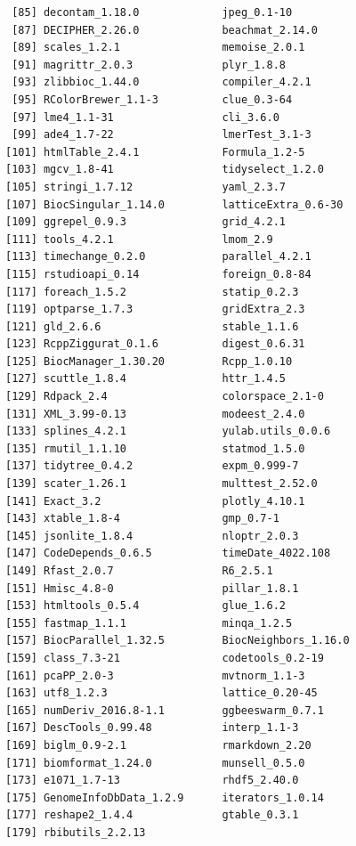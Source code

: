 \documentclass[
]{book}
\begin{document}
\begin{verbatim}
 [85] decontam_1.18.0             jpeg_0.1-10                
 [87] DECIPHER_2.26.0             beachmat_2.14.0            
 [89] scales_1.2.1                memoise_2.0.1              
 [91] magrittr_2.0.3              plyr_1.8.8                 
 [93] zlibbioc_1.44.0             compiler_4.2.1             
 [95] RColorBrewer_1.1-3          clue_0.3-64                
 [97] lme4_1.1-31                 cli_3.6.0                  
 [99] ade4_1.7-22                 lmerTest_3.1-3             
[101] htmlTable_2.4.1             Formula_1.2-5              
[103] mgcv_1.8-41                 tidyselect_1.2.0           
[105] stringi_1.7.12              yaml_2.3.7                 
[107] BiocSingular_1.14.0         latticeExtra_0.6-30        
[109] ggrepel_0.9.3               grid_4.2.1                 
[111] tools_4.2.1                 lmom_2.9                   
[113] timechange_0.2.0            parallel_4.2.1             
[115] rstudioapi_0.14             foreign_0.8-84             
[117] foreach_1.5.2               statip_0.2.3               
[119] optparse_1.7.3              gridExtra_2.3              
[121] gld_2.6.6                   stable_1.1.6               
[123] RcppZiggurat_0.1.6          digest_0.6.31              
[125] BiocManager_1.30.20         Rcpp_1.0.10                
[127] scuttle_1.8.4               httr_1.4.5                 
[129] Rdpack_2.4                  colorspace_2.1-0           
[131] XML_3.99-0.13               modeest_2.4.0              
[133] splines_4.2.1               yulab.utils_0.0.6          
[135] rmutil_1.1.10               statmod_1.5.0              
[137] tidytree_0.4.2              expm_0.999-7               
[139] scater_1.26.1               multtest_2.52.0            
[141] Exact_3.2                   plotly_4.10.1              
[143] xtable_1.8-4                gmp_0.7-1                  
[145] jsonlite_1.8.4              nloptr_2.0.3               
[147] CodeDepends_0.6.5           timeDate_4022.108          
[149] Rfast_2.0.7                 R6_2.5.1                   
[151] Hmisc_4.8-0                 pillar_1.8.1               
[153] htmltools_0.5.4             glue_1.6.2                 
[155] fastmap_1.1.1               minqa_1.2.5                
[157] BiocParallel_1.32.5         BiocNeighbors_1.16.0       
[159] class_7.3-21                codetools_0.2-19           
[161] pcaPP_2.0-3                 mvtnorm_1.1-3              
[163] utf8_1.2.3                  lattice_0.20-45            
[165] numDeriv_2016.8-1.1         ggbeeswarm_0.7.1           
[167] DescTools_0.99.48           interp_1.1-3               
[169] biglm_0.9-2.1               rmarkdown_2.20             
[171] biomformat_1.24.0           munsell_0.5.0              
[173] e1071_1.7-13                rhdf5_2.40.0               
[175] GenomeInfoDbData_1.2.9      iterators_1.0.14           
[177] reshape2_1.4.4              gtable_0.3.1               
[179] rbibutils_2.2.13           
\end{verbatim}
\end{document}
